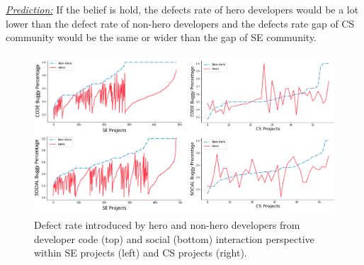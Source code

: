 \documentclass[sigconf,review,anonymous]{acmart}
\begin{document}
\noindent \textit{\underline{Prediction:}} If the belief is hold, the defects rate of hero developers would be a lot lower than the defect  rate of non-hero developers and the defects  rate gap of CS community would be the same or wider than the gap of SE community.  


\begin{figure}[!t]
\hspace{-0.5cm}\includegraphics[width=1.05\linewidth, height=6cm]{img/heroes_1.png}
\caption{Defect rate introduced by hero and non-hero developers from developer code (top) and social (bottom) interaction perspective within SE projects (left) and CS projects (right). }\label{fig:heroes}
\end{figure}
\end{document}

